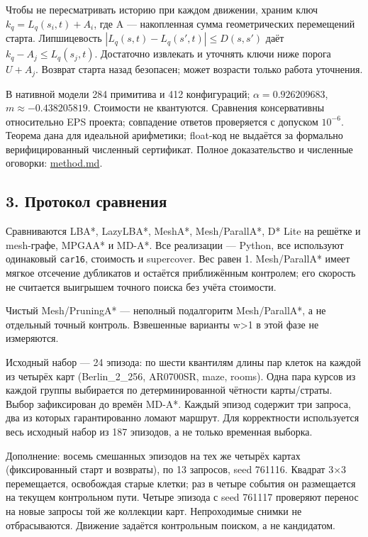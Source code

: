 \documentclass[
  10pt,
]{article}
\begin{document}
Чтобы не пересматривать историю при каждом движении, храним ключ
\(k_q=L_q(s_i,t)+A_i\), где A --- накопленная сумма геометрических
перемещений старта. Липшицевость \(|L_q(s,t)-L_q(s',t)|\le D(s,s')\)
даёт \(k_q-A_j\le L_q(s_j,t)\). Достаточно извлекать и уточнять ключи
ниже порога \(U+A_j\). Возврат старта назад безопасен; может возрасти
только работа уточнения.

В нативной модели 284 примитива и 412 конфигураций;
\(\alpha=0.926209683\), \(m\approx-0.438205819\). Стоимости не
квантуются. Сравнения консервативны относительно EPS проекта; совпадение
ответов проверяется с допуском \(10^{-6}\). Теорема дана для идеальной
арифметики; float-код не выдаётся за формально верифицированный
численный сертификат. Полное доказательство и численные оговорки:
\url{method.md}.

\subsection{3. Протокол
сравнения}\label{ux43fux440ux43eux442ux43eux43aux43eux43b-ux441ux440ux430ux432ux43dux435ux43dux438ux44f}

Сравниваются LBA*, LazyLBA*, MeshA*, Mesh/ParallA*, D* Lite на решётке и
mesh-графе, MPGAA* и MD-A*. Все реализации --- Python, все используют
одинаковый \texttt{car16}, стоимость и supercover. Вес равен 1.
Mesh/ParallA* имеет мягкое отсечение дубликатов и остаётся приближённым
контролем; его скорость не считается выигрышем точного поиска без учёта
стоимости.

Чистый Mesh/PruningA* --- неполный подалгоритм Mesh/ParallA*, а не
отдельный точный контроль. Взвешенные варианты w\textgreater1 в этой
фазе не измеряются.

Исходный набор --- 24 эпизода: по шести квантилям длины пар клеток на
каждой из четырёх карт (Berlin\_2\_256, AR0700SR, maze, rooms). Одна
пара курсов из каждой группы выбирается по детерминированной чётности
карты/страты. Выбор зафиксирован до времён MD-A*. Каждый эпизод содержит
три запроса, два из которых гарантированно ломают маршрут. Для
корректности используется весь исходный набор из 187 эпизодов, а не
только временная выборка.

Дополнение: восемь смешанных эпизодов на тех же четырёх картах
(фиксированный старт и возвраты), по 13 запросов, seed 761116. Квадрат
3×3 перемещается, освобождая старые клетки; раз в четыре события он
размещается на текущем контрольном пути. Четыре эпизода с seed 761117
проверяют перенос на новые запросы той же коллекции карт. Непроходимые
снимки не отбрасываются. Движение задаётся контрольным поиском, а не
кандидатом.
\end{document}
